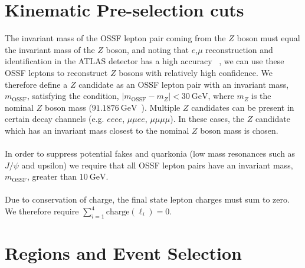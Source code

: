 \section{Kinematic Pre-selection cuts}
The invariant mass of the OSSF lepton pair coming from the $Z$ boson must equal the invariant mass of the $Z$ boson, and noting that $e$,$\mu$ reconstruction and identification in the ATLAS detector has a high accuracy ~\cite{}, we can use these OSSF leptons to reconstruct $Z$ bosons with relatively high confidence. We therefore define a $Z$ candidate as an OSSF lepton pair with an invariant mass, $m_{\text{OSSF}}$, satisfying the condition, $|m_{\text{OSSF}} - m_Z| <  \SI{30}{\GeV}$, where $m_Z$ is the nominal $Z$ boson mass ($\SI{91.1876}{\GeV}$~\cite{pdg}). Multiple $Z$ candidates can be present in certain decay channels (e.g. $eeee$, $\mu\mu ee$, $\mu \mu \mu \mu$). In these cases, the $Z$ candidate which has an invariant mass closest to the nominal $Z$ boson mass is chosen.\\\\
In order to suppress potential fakes and quarkonia (low mass resonances such as $J/\psi$ and upsilon) we require that all OSSF lepton pairs have an invariant mass, $m_{\text{OSSF}}$, greater than $\SI{10}{\GeV}$.\\\\
Due to conservation of charge, the final state lepton charges must sum to zero.\\ We therefore require $\displaystyle\sum_{i=1}^{4} \text{charge}(\ell_i) = 0$.

\section{Regions and Event Selection}
\label{sec:regionsAndEventSelection}


